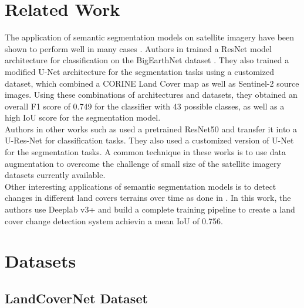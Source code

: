 \documentclass[conference]{IEEEtran}
\begin{document}
\section{Related Work}
The application of semantic segmentation models on satellite imagery have been shown to perform well in many cases \cite{DBLP:journals/corr/abs-2003-02899}\cite{DBLP:journals/corr/abs-2010-06285}\cite{DBLP:journals/corr/abs-1911-12903}\cite{Avenash2019SemanticSO}\cite{9137717}\cite{DBLP:journals/corr/BadrinarayananK15}\cite{DBLP:journals/corr/abs-1711-08681}\cite{DBLP:journals/corr/abs-1904-03983}\cite{DBLP:journals/corr/abs-1902-04604}.
Authors in \cite{DBLP:journals/corr/abs-2003-02899} trained a ResNet model architecture for classification on the BigEarthNet dataset \cite{DBLP:journals/corr/abs-1902-06148}. They also trained a modified U-Net architecture for the segmentation tasks using a customized dataset, which combined a CORINE Land Cover map as well as Sentinel-2 source images. Using these combinations of architectures and datasets, they obtained an overall F1 score of 0.749 for the classifier with 43 possible classes, as well as a high IoU score for the segmentation model. \\ \indent
Authors in other works such as \cite{DBLP:journals/corr/abs-2010-06285} used a pretrained ResNet50 and transfer it into a U-Res-Net for classification tasks. They also used a customized version of U-Net for the segmentation tasks. A common technique in these works is to use data  augmentation to overcome the challenge of small size of the satellite imagery datasets currently available.  \\ \indent
Other interesting applications of semantic segmentation models is to detect changes in different land covers terrains over time as done in \cite{DBLP:journals/corr/abs-1911-12903}. In this work, the authors use Deeplab v3+  \cite{DBLP:journals/corr/ChenPSA17} and build a complete training pipeline to create a land cover change detection system achievin a mean IoU of 0.756.




\section{Datasets}
\subsection{LandCoverNet Dataset}
\end{document}
